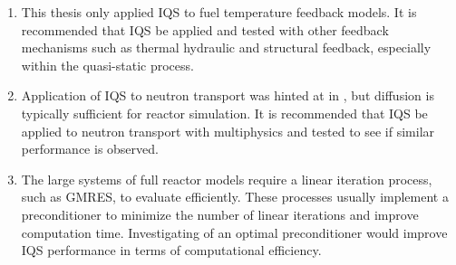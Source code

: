 \begin{enumerate}

\item This thesis only applied IQS to fuel temperature feedback models. It is recommended that IQS be applied and tested with other feedback mechanisms such as thermal hydraulic and structural feedback, especially within the quasi-static process.

\item Application of IQS to neutron transport was hinted at in , but diffusion is typically sufficient for reactor simulation. It is recommended that IQS be applied to neutron transport with multiphysics and tested to see if similar performance is observed.

\item The large systems of full reactor models require a linear iteration process, such as GMRES, to evaluate efficiently. These processes usually implement a preconditioner to minimize the number of linear iterations and improve computation time. Investigating of an optimal preconditioner would  improve IQS performance in terms of computational efficiency.

\end{enumerate}